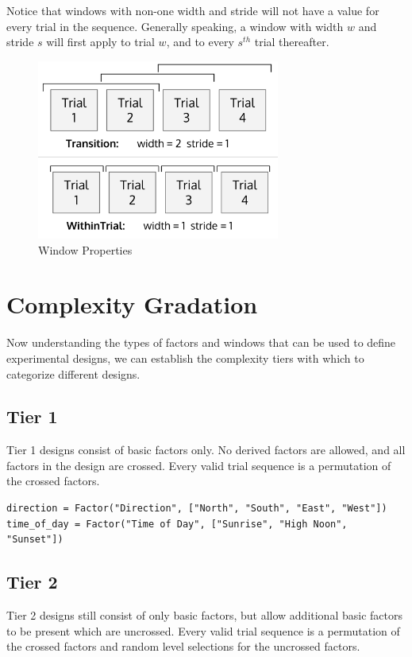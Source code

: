 Notice that windows with non-one width and stride will not have a value for every trial in the sequence. Generally speaking, a window with width $w$ and stride $s$ will first apply to trial $w$, and to every $s^{th}$ trial thereafter.

\begin{figure}[htb]
\centering
\centerline{\includegraphics[origin=c,width=8cm]{../figures/windows.png}}
\caption{Window Properties}
\label{fig:windows}
\end{figure}


\section{Complexity Gradation}

Now understanding the types of factors and windows that can be used to define experimental designs, we can establish the complexity tiers with which to categorize different designs.

\subsection{Tier 1}

Tier 1 designs consist of basic factors only. No derived factors are allowed, and all factors in the design are crossed. Every valid trial sequence is a permutation of the crossed factors.

\begin{verbatim}
direction = Factor("Direction", ["North", "South", "East", "West"])
time_of_day = Factor("Time of Day", ["Sunrise", "High Noon", "Sunset"])
\end{verbatim}

\subsection{Tier 2}

Tier 2 designs still consist of only basic factors, but allow additional basic factors to be present which are uncrossed. Every valid trial sequence is a permutation of the crossed factors and random level selections for the uncrossed factors.

